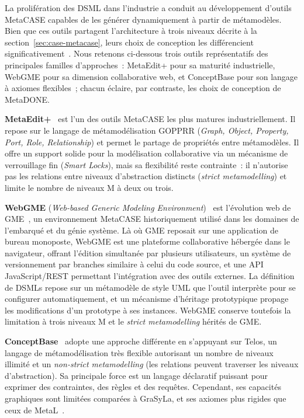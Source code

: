 La prolifération des DSML dans l'industrie a conduit au développement d'outils MetaCASE capables de les générer dynamiquement à partir de métamodèles. Bien que ces outils partagent l'architecture à trois niveaux décrite à la section~\ref{sec:case-metacase}, leurs choix de conception les différencient significativement~\cite{Eng2007}. Nous retenons ci-dessous trois outils représentatifs des principales familles d'approches~: MetaEdit+ pour sa maturité industrielle, WebGME pour sa dimension collaborative web, et ConceptBase pour son langage à axiomes flexibles~; chacun éclaire, par contraste, les choix de conception de MetaDONE.

\textbf{MetaEdit+}~\cite{kelly1996metaedit+} est l'un des outils MetaCASE les plus matures industriellement. Il repose sur le langage de métamodélisation GOPPRR (\textit{Graph, Object, Property, Port, Role, Relationship}) et permet le partage de propriétés entre métamodèles. Il offre un support solide pour la modélisation collaborative via un mécanisme de verrouillage fin (\textit{Smart Locks}), mais sa flexibilité reste contrainte~: il n'autorise pas les relations entre niveaux d'abstraction distincts (\textit{strict metamodelling}) et limite le nombre de niveaux M à deux ou trois.

\textbf{WebGME} (\textit{Web-based Generic Modeling Environment})~\cite{webgme} est l'évolution web de GME~\cite{ledeczi2001generic}, un environnement MetaCASE historiquement utilisé dans les domaines de l'embarqué et du génie système. Là où GME reposait sur une application de bureau monoposte, WebGME est une plateforme collaborative hébergée dans le navigateur, offrant l'édition simultanée par plusieurs utilisateurs, un système de versionnement par branches similaire à celui du code source, et une API JavaScript/REST permettant l'intégration avec des outils externes. La définition de DSMLs repose sur un métamodèle de style UML que l'outil interprète pour se configurer automatiquement, et un mécanisme d'héritage prototypique propage les modifications d'un prototype à ses instances. WebGME conserve toutefois la limitation à trois niveaux M et le \textit{strict metamodelling} hérités de GME.

\textbf{ConceptBase}~\cite{jeusfeld2005meta} adopte une approche différente en s'appuyant sur Telos, un langage de métamodélisation très flexible autorisant un nombre de niveaux illimité et un \textit{non-strict metamodelling} (les relations peuvent traverser les niveaux d'abstraction). Sa principale force est un langage déclaratif puissant pour exprimer des contraintes, des règles et des requêtes. Cependant, ses capacités graphiques sont limitées comparées à GraSyLa, et ses axiomes plus rigides que ceux de MetaL~\cite{Eng2007}.

